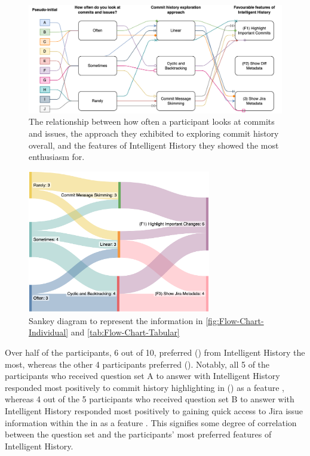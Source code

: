 \begin{figure}[h]
  \centering
  \includegraphics[width=12cm]{./images/flow-chart-ind.png}
  \caption{
    The relationship between how often a participant looks at commits and issues, the approach they exhibited to exploring commit history overall, and the features of Intelligent History they showed the most enthusiasm for.
  }
  \label{fig:Flow-Chart-Individual}
\end{figure}

\begin{figure}[h]
  \centering
  \includegraphics[width=8cm]{./images/flow-chart-aggr.png}
  \caption{
    Sankey diagram to represent the information in \autoref{fig:Flow-Chart-Individual} and \autoref{tab:Flow-Chart-Tabular}
  }
  \label{fig:Flow-Chart-Aggregate}
\end{figure}

Over half of the participants, 6 out of 10, preferred () from Intelligent History the most,
whereas the other 4 participants preferred ().
Notably, all 5 of the participants who received question set A to answer with Intelligent History responded most positively to commit history highlighting in () as a feature , 
whereas 4 out of the 5 participants who received question set B to answer with Intelligent History responded most positively to gaining quick access to Jira issue information within the  in  as a feature .
This signifies some degree of correlation between the question set and the participants' most preferred features of Intelligent History.

